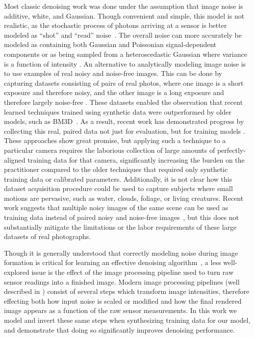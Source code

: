 \documentclass[10pt,twocolumn,letterpaper]{article}
\begin{document}
Most classic denoising work was done under the assumption that image noise is additive, white, and Gaussian.
Though convenient and simple, this model is not realistic, as the stochastic process of photons arriving at a sensor is better
modeled as ``shot'' and ``read'' noise~\cite{Hasinoff2014}.
The overall noise can more accurately be modeled as containing both Gaussian and Poissonian signal-dependent components \cite{PoissonianGaussianNoise} or as being sampled from a heteroscedastic Gaussian where variance is a function of intensity \cite{Hasinoff2010}.
An alternative to analytically modeling image noise is to use examples of real noisy and noise-free images.
This can be done by capturing datasets consisting of pairs of real photos, where one image is a short exposure and therefore noisy, and the other image is a long exposure and therefore largely noise-free \cite{anaya2014renoir,plotz2017cvpr}.
These datasets enabled the observation that recent learned techniques trained using synthetic data were outperformed by older models, such as BM3D~\cite{anaya2014renoir,plotz2017cvpr}. 
As a result, recent work has demonstrated progress by collecting this real, paired data not just for evaluation, but for training models \cite{SIDD,chen2018cvpr,schwartz2018itip}. These approaches show great promise, but applying such a technique to a particular camera requires the laborious collection of large amounts of perfectly-aligned training data for that camera, significantly increasing the burden on the practitioner compared to the older techniques that required only synthetic training data or calibrated parameters. Additionally, it is not clear how this dataset acquisition procedure could be used to capture subjects where small motions are pervasive, such as water, clouds, foliage, or living creatures.
Recent work suggests that multiple noisy images of the same scene can be used as training data instead of paired noisy and noise-free images~\cite{Noise2Noise}, but this does not substantially mitigate the limitations or the labor requirements of these large datasets of real photographs.

Though it is generally understood that correctly modeling noise during image formation is critical for learning an effective denoising algorithm~\cite{Hasinoff2010, Liu2008, Mildenhall_2018_CVPR, NNN}, a less well-explored issue is the effect of the image processing pipeline used to turn raw sensor readings into a finished image.
Modern image processing pipelines (well described in \cite{hasinoff2016burst}) consist of several steps which transform image intensities, therefore effecting both how input noise is scaled or modified and how the final rendered image appears as a function of the raw sensor measurements.
In this work we model and invert these same steps when synthesizing training data for our model, and demonstrate that doing so significantly improves denoising performance.
\end{document}
